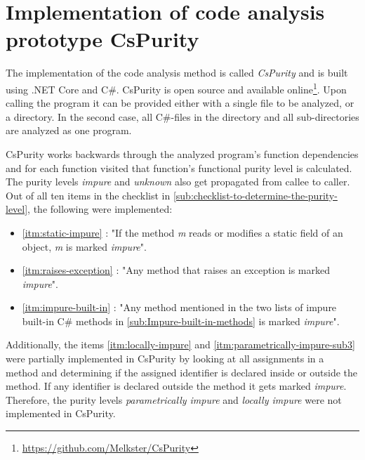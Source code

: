 \documentclass[a4paper,12pt]{article}
\newcommand{\Autoref}[1]{%
  \begingroup%
  \def\chapterautorefname{Chapter}%
  \def\sectionautorefname{Section}%
  \def\subsectionautorefname{Subsection}%
  \def\itemautorefname{Item}%
  \autoref{#1}%
  \endgroup%
}
\begin{document}
\section{Implementation of code analysis prototype CsPurity} \label{sec:implementation-of-cspurity}

The implementation of the code analysis method is called \textit{CsPurity} and is built using .NET Core and C\#. CsPurity is open source and available online\footnote{\url{https://github.com/Melkster/CsPurity}}. Upon calling the program it can be provided either with a single file to be analyzed, or a directory. In the second case, all C\#-files in the directory and all sub-directories are analyzed as one program.

CsPurity works backwards through the analyzed program's function dependencies and for each function visited that function's functional purity level is calculated. The purity levels \textit{impure} and \textit{unknown} also get propagated from callee to caller. Out of all ten items in the checklist in \autoref{sub:checklist-to-determine-the-purity-level}, the following were implemented:

\begin{itemize}
  \item \Autoref{itm:static-impure}: "If the method \textit{m} reads or modifies a static field of an object, \textit{m} is marked \textit{impure}".
  \item \Autoref{itm:raises-exception}: "Any method that raises an exception is marked \textit{impure}".
  \item \Autoref{itm:impure-built-in}: "Any method mentioned in the two lists of impure built-in C\# methods in \autoref{sub:Impure-built-in-methods} is marked \textit{impure}".
\end{itemize}


Additionally, the items \ref{itm:locally-impure} and \ref{itm:parametrically-impure-sub3} were partially implemented in CsPurity by looking at all assignments in a method and determining if the assigned identifier is declared inside or outside the method. If any identifier is declared outside the method it gets marked \textit{impure}. Therefore, the purity levels \textit{parametrically impure} and \textit{locally impure} were not implemented in CsPurity.
\end{document}
